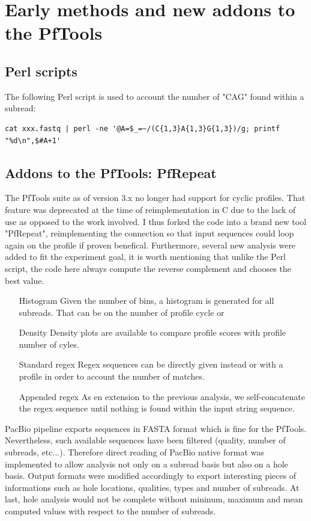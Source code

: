 \documentclass[notitlepage,a4paper]{article}\usepackage[]{graphicx}\usepackage[]{color}
\begin{document}
\section{Early methods and new addons to the PfTools}
\subsection{Perl scripts}
The following Perl script is used to account the number of "CAG" found within a subread:
\begin{verbatim}
cat xxx.fastq | perl -ne '@A=$_=~/(C{1,3}A{1,3}G{1,3})/g; printf "%d\n",$#A+1'
\end{verbatim}


\subsection{Addons to the PfTools: PfRepeat}
The PfTools suite as of version 3.x no longer had support for cyclic profiles. That feature was deprecated at the time of reimplementation in C due to the lack of use as opposed to the work involved.
I thus forked the code into a brand new tool "PfRepeat", reimplementing the connection so that input sequences could loop again on the profile if proven benefical.
Furthermore, several new analysis were added to fit the experiment goal, it is worth mentioning that unlike the Perl script, the code here always compute the reverse complement and chooses the best value.
\begin{enumerate}
  \item[Histogram] Given the number of bins, a histogram is generated for all subreads. That can be on the number of profile cycle or 
  \item[Density] Density plots are available to compare profile scores with profile number of cyles.
  \item[Standard regex] Regex sequences can be directly given instead or with a profile in order to account the number of matches.
  \item[Appended regex] As en extension to the previous analysis, we self-concatenate the regex sequence until nothing is found within the input string sequence. 
\end{enumerate}

PacBio pipeline exports sequences in FASTA format which is fine for the PfTools. Nevertheless, such available sequences have been filtered (quality, number of subreads, etc...). Therefore direct reading of PacBio native format was implemented to allow analysis not only on a subread basis but also on a hole basis. Output formats were modified accordingly to export interesting pieces of informations such as hole locations, qualities, types and number of subreads. At last, hole analysis would not be complete without mininum, maximum and mean computed values with respect to the number of subreads.
\end{document}
